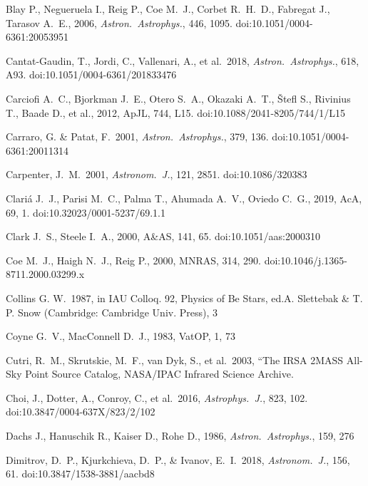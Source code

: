\documentclass{jaa}
\def\apj{{\it Astrophys.~J.}}
\def\aj{{\it Astronom.~J.}}
\def\aap{{\it Astron.~Astrophys.}}
\begin{document}
\begin{thebibliography}{99}
 Blay P., Negueruela I., Reig P., Coe M.~J., Corbet R.~H.~D., Fabregat J., Tarasov A.~E., 2006, \aap, 446, 1095. doi:10.1051/0004-6361:20053951

 Cantat-Gaudin, T., Jordi, C., Vallenari, A., et al.\ 2018, \aap, 618, A93. doi:10.1051/0004-6361/201833476

 Carciofi A.~C., Bjorkman J.~E., Otero S.~A., Okazaki A.~T., {\v{S}}tefl S., Rivinius T., Baade D., et al., 2012, ApJL, 744, L15. doi:10.1088/2041-8205/744/1/L15

 Carraro, G. \& Patat, F.\ 2001, \aap, 379, 136. doi:10.1051/0004-6361:20011314

 Carpenter, J.~M.\ 2001, \aj, 121, 2851. doi:10.1086/320383

 Clari{\'a} J.~J., Parisi M.~C., Palma T., Ahumada A.~V., Oviedo C.~G., 2019, AcA, 69, 1. doi:10.32023/0001-5237/69.1.1

 Clark J.~S., Steele I.~A., 2000, A\&AS, 141, 65. doi:10.1051/aas:2000310

 Coe M.~J., Haigh N.~J., Reig P., 2000, MNRAS, 314, 290. doi:10.1046/j.1365-8711.2000.03299.x


 Collins G. W.\ 1987, in IAU Colloq. 92, Physics of Be Stars, ed.A. Slettebak \& T. P. Snow (Cambridge: Cambridge Univ. Press), 3

 Coyne G.~V., MacConnell D.~J., 1983, VatOP, 1, 73

 Cutri, R.~M., Skrutskie, M.~F., van Dyk, S., et al.\ 2003, ``The IRSA 2MASS All-Sky Point Source Catalog, NASA/IPAC Infrared Science Archive. 

 Choi, J., Dotter, A., Conroy, C., et al.\ 2016, \apj, 823, 102. doi:10.3847/0004-637X/823/2/102

 Dachs J., Hanuschik R., Kaiser D., Rohe D., 1986, \aap, 159, 276

 Dimitrov, D.~P., Kjurkchieva, D.~P., \& Ivanov, E.~I.\ 2018, \aj, 156, 61. doi:10.3847/1538-3881/aacbd8


\end{thebibliography}
\end{document}
